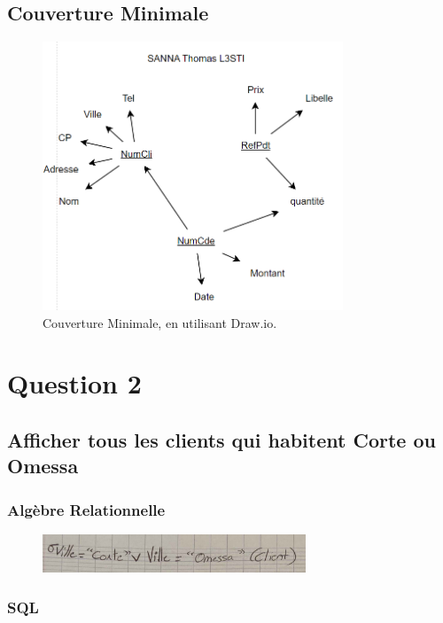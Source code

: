 \documentclass{article}
\begin{document}
\subsection{Couverture Minimale}

\begin{figure}[H]
  \centering
  \includegraphics[width=0.8\textwidth]{graphs/couv-mini.png}
  \caption{Couverture Minimale, en utilisant Draw.io.}
  \label{fig:CM}
\end{figure}

\break\section{Question 2}

\subsection{Afficher tous les clients qui habitent Corte ou Omessa}

\subsubsection{Algèbre Relationnelle}

\begin{figure}[H]
  \centering
  \includegraphics[width=0.7\textwidth]{alg/1.png}
  \label{fig:alg-rel}
\end{figure}

\subsubsection{SQL}
\end{document}
